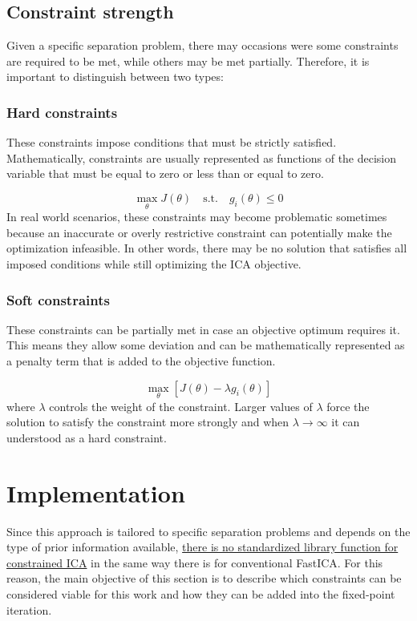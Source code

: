 \subsection{Constraint strength}

Given a specific separation problem, there may occasions were some constraints are required to be met, while others may be met partially. Therefore, it is important to distinguish between two types:

\subsubsection{Hard constraints}

These constraints impose conditions that must be strictly satisfied. Mathematically, constraints are usually represented as functions of the decision variable that must be equal to zero or less than or equal to zero.

\[
\max_{\theta} J(\theta)
\quad \text{s.t.} \quad
g_i(\theta) \leq 0
\]
In real world scenarios, these constraints may become problematic sometimes because an inaccurate or overly restrictive constraint can potentially make the optimization infeasible. In other words, there may be no solution that satisfies all imposed conditions while still optimizing the ICA objective.


\subsubsection{Soft constraints}
These constraints can be partially met in case an objective optimum requires it. This means they allow some deviation and can be mathematically represented as a penalty term that is added to the objective function. 

\[
    \max_{\theta}
    \left[
    J(\theta) - \lambda g_i(\theta)
    \right]
\]
where $\lambda$ controls the weight of the constraint. Larger values of $\lambda$ force the solution to satisfy the constraint more strongly and when $\lambda \rightarrow \infty$ it can understood as a hard constraint.
\section{Implementation}
\label{sec:constrained_ica_implementation}

Since this approach is tailored to specific separation problems and depends on the type of prior information available, \uline{there is no standardized library function for constrained ICA} in the same way there is for conventional FastICA. For this reason, the main objective of this section is to describe which constraints can be considered viable for this work and how they can be added into the fixed-point iteration.


